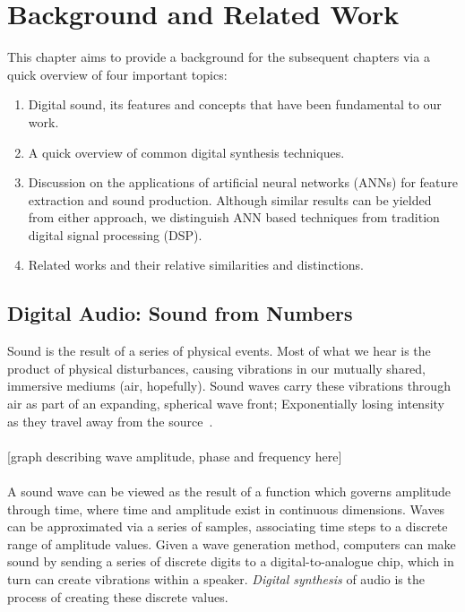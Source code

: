 \documentclass[\main/thesis.tex]{subfiles}
\begin{document}
\chapter{Background and Related Work}

%    

This chapter aims to provide a background for the subsequent chapters via a quick overview of four important topics:\\ 
\begin{enumerate}[label=(\roman*)]
\item Digital sound, its features and concepts that have been fundamental to our work.
\item A quick overview of common digital synthesis techniques.
\item Discussion on the applications of artificial neural networks (ANNs) for feature extraction and sound production. Although similar results can be yielded from either approach, we distinguish ANN based techniques from tradition digital signal processing (DSP).
\item Related works and their relative similarities and distinctions.
\end{enumerate}
\section{Digital Audio: Sound from Numbers}
Sound is the result of a series of physical events. Most of what we hear is the product of physical disturbances, causing vibrations in our mutually shared, immersive mediums (air, hopefully). Sound waves carry these vibrations through air as part of an expanding, spherical wave front; Exponentially losing intensity as they travel away from the source~\cite{cook1999chap4}. 
\\\\

[graph describing wave amplitude, phase and frequency here]
\\\\
A sound wave can be viewed as the result of a function which governs amplitude through time, where time and amplitude exist in continuous dimensions. Waves can be approximated via a series of samples, associating time steps to a discrete range of amplitude values. 
Given a wave generation method, computers can make sound by sending a series of discrete digits to a digital-to-analogue chip, which in turn can
create vibrations within a speaker.  \textit{Digital synthesis} of audio is the process of creating these discrete values. 
\\
\end{document}
